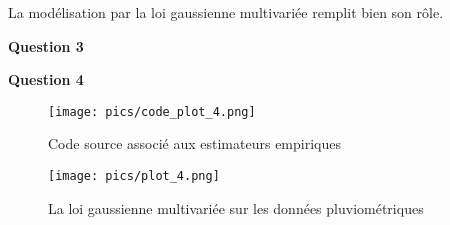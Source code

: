 \documentclass{article}
\begin{document}
La modélisation par la loi gaussienne multivariée remplit bien son rôle.

\vspace{2\baselineskip}

	\textbf{Question 3}

\vspace{2\baselineskip}

	\textbf{Question 4}

\vspace{2\baselineskip}

\begin{figure}[h]
	\begin{minipage}[t]{0.6\textwidth}
		\centering
		\texttt{[image: pics/code\_plot\_4.png]}
		\caption{Code source associé aux estimateurs empiriques}
	\end{minipage}
	\hfill %
	\begin{minipage}[t]{0.6\textwidth}
		\centering
		\texttt{[image: pics/plot\_4.png]}
		\caption{La loi gaussienne multivariée sur les données pluviométriques}
	\end{minipage}
\end{figure}
\end{document}
